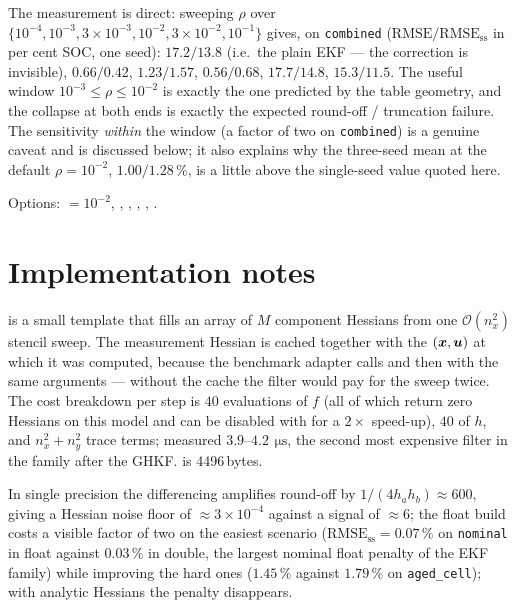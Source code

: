 The measurement is direct: sweeping $\rho$ over $\{10^{-4},10^{-3},3{\times}10^{-3},10^{-2},
3{\times}10^{-2},10^{-1}\}$ gives, on \texttt{combined}
($\text{RMSE}/\text{RMSE}_{\text{ss}}$ in per cent SOC, one seed):
$17.2/13.8$ (i.e.\ the plain EKF --- the correction is invisible), $0.66/0.42$, $1.23/1.57$,
$0.56/0.68$, $17.7/14.8$, $15.3/11.5$. The useful window $10^{-3}\le\rho\le10^{-2}$ is exactly
the one predicted by the table geometry, and the collapse at both ends is exactly the expected
round-off / truncation failure. The sensitivity \emph{within} the window (a factor of two on
\texttt{combined}) is a genuine caveat and is discussed below; it also explains why the
three-seed mean at the default $\rho = 10^{-2}$, $1.00/1.28\,\%$, is a little above the
single-seed value quoted here.

Options:  $=10^{-2}$, , ,
, , .

\section{Implementation notes}
 is a small template that fills an array of $M$
component Hessians from one $\mathcal{O}(n_x^2)$ stencil sweep. The measurement Hessian is
cached together with the $(\bm{x},\bm{u})$ at which it was computed, because the benchmark adapter
calls  and then  with the same arguments ---
without the cache the filter would pay for the sweep twice. The cost breakdown per step is
$40$ evaluations of $f$ (all of which return zero Hessians on this model and can be disabled
with  for a $2\times$ speed-up), $40$ of $h$, and
$n_x^2 + n_y^2$ trace terms; measured $3.9$--$4.2\,\SI{}{\micro\second}$, the second most
expensive filter in the family after the GHKF.  is
4496\,bytes.

In single precision the differencing amplifies round-off by $1/(4h_ah_b)\approx 600$, giving a
Hessian noise floor of $\approx 3\times10^{-4}$ against a signal of $\approx 6$; the float
build costs a visible factor of two on the easiest scenario
($\text{RMSE}_{\text{ss}} = 0.07\,\%$ on \texttt{nominal} in float against $0.03\,\%$ in
double, the largest nominal float penalty of the EKF family) while improving the hard ones
($1.45\,\%$ against $1.79\,\%$ on \texttt{aged\_cell}); with analytic Hessians the penalty
disappears.

